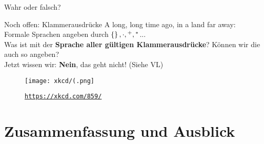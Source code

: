 \begin{frame}[t]{Wahr oder falsch?}
\end{frame}

%

\begin{frame}{Noch offen: Klammerausdrücke}
	A long, long time ago, in a land far away:\\
	\medskip
	Formale Sprachen angeben durch $\left\{\right\}, \cdot, {}^+, {}^*$...\\
	Was ist mit der \textbf{Sprache aller gültigen Klammerausdrücke}? Können wir die auch so angeben?\\[1em]
	\pause
	\impl Jetzt wissen wir: \textbf{Nein}, das geht nicht! (Siehe VL)\\[1em]
	
	\begin{figure}[H]
		\centering
		\texttt{[image: xkcd/(.png]}
		\vspace{-7pt}
		\caption{ \texttt{\url{https://xkcd.com/859/}} }
	\end{figure}
\end{frame}





\appendix
\beginbackup

\section{Zusammenfassung und Ausblick}

